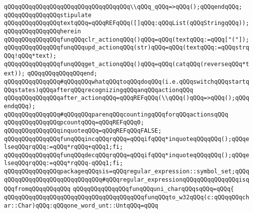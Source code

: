 \verb|qQQqqQQqqQQqqQQqqQQqqQQqqQQqqQQqqQQq\\qQQq_qQQq=>qQQq();qQQqendqQQq;|\newline
\newline
\verb|qQQqqQQqqQQqqQQqstipulate|\newline
\verb|qQQqqQQqqQQqqQQqtextqQQq=qQQqREFqQQq([]qQQq:qQQqList(qQQqStringqQQq));|\newline
\verb|qQQqqQQqqQQqqQQqherein|\newline
\verb|qQQqqQQqqQQqqQQqfunqQQqclr_actionqQQq()qQQq=qQQq(textqQQq:=qQQq["("]);|\newline
\verb|qQQqqQQqqQQqqQQqfunqQQqupd_actionqQQq(str)qQQq=qQQq(textqQQq:=qQQqstrqQQq!qQQq*text);|\newline
\verb|qQQqqQQqqQQqqQQqfunqQQqget_actionqQQq()qQQq=qQQq(catqQQq(reverseqQQq*text));|\newline
\verb|qQQqqQQqqQQqqQQqend;|\newline
\newline
\verb|qQQqqQQqqQQqqQQq#qQQqqQQqwhatqQQqtoqQQqdoqQQq(i.e.qQQqswitchqQQqstartqQQqstates)qQQqafterqQQqrecognizingqQQqanqQQqactionqQQq|\newline
\verb|qQQqqQQqqQQqqQQqafter_actionqQQq=qQQqREFqQQq(\\qQQq()qQQq=>qQQq();qQQqendqQQq);|\newline
\newline
\verb|qQQqqQQqqQQqqQQq#qQQqqQQqparenqQQqcountingqQQqforqQQqactionsqQQq|\newline
\verb|qQQqqQQqqQQqqQQqpcountqQQq=qQQqREFqQQq0;|\newline
\verb|qQQqqQQqqQQqqQQqinquoteqQQq=qQQqREFqQQqFALSE;|\newline
\verb|qQQqqQQqqQQqqQQqfunqQQqincqQQqrqQQq=qQQqifqQQq*inquoteqQQqqQQq();qQQqelseqQQqrqQQq:=qQQq*rqQQq+qQQq1;fi;|\newline
\verb|qQQqqQQqqQQqqQQqfunqQQqdecqQQqrqQQq=qQQqifqQQq*inquoteqQQqqQQq();qQQqelseqQQqrqQQq:=qQQq*rqQQq-qQQq1;fi;|\newline
\newline
\verb|qQQqqQQqqQQqqQQqpackageqQQqsis=qQQqregular_expression::symbol_set;qQQqqQQqqQQqqQQqqQQqqQQqqQQqqQQq#qQQqregular_expressionqQQqqQQqqQQqqQQqisqQQqfromqQQqqQQqqQQq|\newline
\newline
\verb|qQQqqQQqqQQqqQQqfunqQQquni_charqQQqsqQQq=qQQq{|\newline
\verb|qQQqqQQqqQQqqQQqqQQqqQQqqQQqqQQqqQQqqQQqfunqQQqto_w32qQQq(c:qQQqqQQqchar::Char)qQQq:qQQqone_word_unt::UntqQQq=qQQq|\newline
